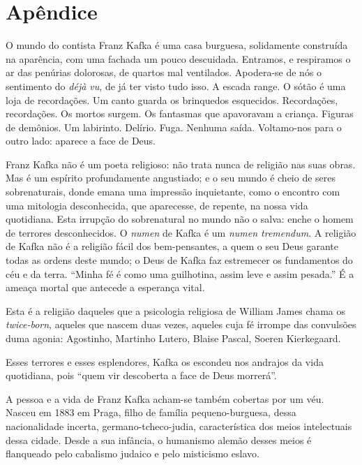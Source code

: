 \part{Apêndice}
\blankpage


\noindent{}O mundo do contista Franz Kafka é uma casa burguesa, solidamente construída na aparência, com uma fachada um pouco descuidada. Entramos, e respiramos o ar das penúrias dolorosas, de quartos mal ventilados. Apodera-se de nós o sentimento
do \textit{déjà vu}, de já ter visto tudo isso. A escada range. O sótão é uma
loja de recordações. Um canto guarda os brinquedos esquecidos. Recordações,
recordações. Os mortos surgem. Os fantasmas que apavoravam a criança.
Figuras de demônios. Um labirinto. Delírio. Fuga. Nenhuma saída.
Voltamo-nos para o outro lado: aparece a face de Deus.

Franz Kafka não é um poeta religioso: não trata nunca de religião nas suas obras.
Mas é um espírito profundamente angustiado; e o seu mundo é cheio de
seres sobrenaturais, donde emana uma impressão inquietante, como o
encontro com uma mitologia desconhecida, que aparecesse, de repente, na
nossa vida quotidiana. Esta irrupção do sobrenatural no mundo não o
salva: enche o homem de terrores desconhecidos. O \textit{numen} de Kafka é um \textit{numen tremendum}. A religião de Kafka não é a religião fácil dos bem-pensantes, a quem o seu Deus garante todas as
ordens deste mundo; o Deus de Kafka faz estremecer os fundamentos do céu
e da terra. ``Minha fé é como uma guilhotina, assim leve e assim
pesada.'' É a ameaça mortal que antecede a esperança vital.

Esta é a religião daqueles que a psicologia religiosa de William James chama os \textit{twice-born},
aqueles que nascem duas vezes, aqueles cuja fé irrompe das convulsões duma agonia: Agostinho, Martinho Lutero, Blaise Pascal, Soeren Kierkegaard.

Esses terrores e esses esplendores, Kafka os escondeu nos andrajos da vida quotidiana, pois ``quem vir descoberta a face de Deus morrerá''.

A pessoa e a vida de Franz Kafka acham-se também cobertas por um véu.
Nasceu em 1883 em Praga, filho de família pequeno-burguesa, dessa
nacionalidade incerta, germano-tcheco-judia, característica dos meios
intelectuais dessa cidade. Desde a sua infância, o humanismo alemão
desses meios é flanqueado pelo cabalismo
judaico e pelo misticismo eslavo.

